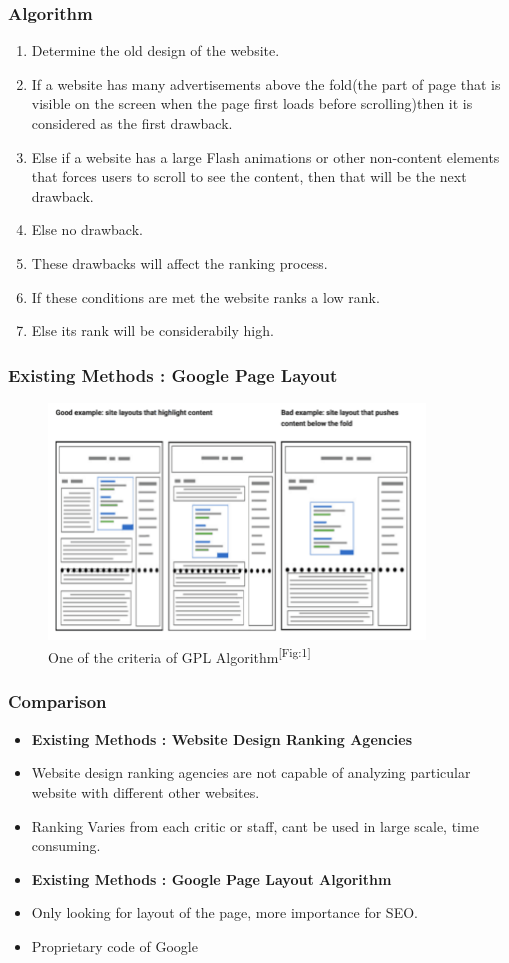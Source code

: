 \documentclass[11pt]{beamer}
\begin{document}
	\begin{frame}
	\frametitle{{Algorithm}}
	\begin{enumerate}
		\item Determine the old design of the website.
		\item If a website has many advertisements above the fold(the part of page that is visible on the screen when the page first loads before scrolling)then it is considered as the first drawback. 
		\item Else if a website has a large Flash animations or other non-content elements that forces users to scroll to see the content, then that will be the next drawback. 
		\item Else no drawback. 
		\item These drawbacks will affect the ranking process.
		\item If these conditions are met the website ranks a low rank.
		\item Else its rank will be considerabily high.
		
	\end{enumerate}
	
	\end{frame}
	\begin{frame}
	\frametitle{{Existing Methods : Google Page Layout}}
		\begin{figure}
		
		\includegraphics[width=10cm]{image/gpa.png}
		\caption{One of the criteria of GPL Algorithm\textsuperscript{[Fig:1]}}
		\label{fig1:gpa}
	\end{figure}
	\end{frame}
\begin{frame}
			\frametitle{{Comparison}}
	\begin{itemize}

		\item \textbf{Existing Methods : Website Design Ranking Agencies}
		\item Website design ranking agencies are not capable of analyzing particular website with different other websites.
		\item Ranking Varies from each critic or staff, cant be used in large scale, time consuming.
		\item \textbf{Existing Methods : Google Page Layout Algorithm}
		\item Only looking for layout of the page, more importance for SEO.
		\item Proprietary code of Google

	\end{itemize}
\end{frame}
\end{document}
